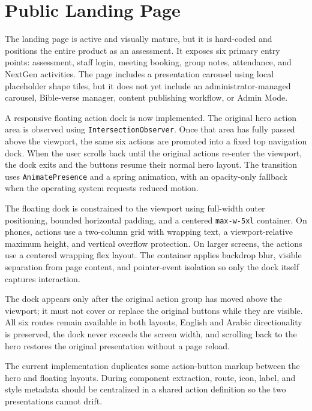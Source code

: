 \documentclass[11pt,a4paper,oneside]{report}
\begin{document}
\section{Public Landing Page}

The landing page is active and visually mature, but it is hard-coded and positions the entire product as an assessment. It exposes six primary entry points: assessment, staff login, meeting booking, group notes, attendance, and NextGen activities. The page includes a presentation carousel using local placeholder shape tiles, but it does not yet include an administrator-managed carousel, Bible-verse manager, content publishing workflow, or Admin Mode.

A responsive floating action dock is now implemented. The original hero action area is observed using \texttt{IntersectionObserver}. Once that area has fully passed above the viewport, the same six actions are promoted into a fixed top navigation dock. When the user scrolls back until the original actions re-enter the viewport, the dock exits and the buttons resume their normal hero layout. The transition uses \texttt{AnimatePresence} and a spring animation, with an opacity-only fallback when the operating system requests reduced motion.

The floating dock is constrained to the viewport using full-width outer positioning, bounded horizontal padding, and a centered \texttt{max-w-5xl} container. On phones, actions use a two-column grid with wrapping text, a viewport-relative maximum height, and vertical overflow protection. On larger screens, the actions use a centered wrapping flex layout. The container applies backdrop blur, visible separation from page content, and pointer-event isolation so only the dock itself captures interaction.

\begin{infobox}
The dock appears only after the original action group has moved above the viewport; it must not cover or replace the original buttons while they are visible. All six routes remain available in both layouts, English and Arabic directionality is preserved, the dock never exceeds the screen width, and scrolling back to the hero restores the original presentation without a page reload.
\end{infobox}

The current implementation duplicates some action-button markup between the hero and floating layouts. During component extraction, route, icon, label, and style metadata should be centralized in a shared action definition so the two presentations cannot drift.
\end{document}
